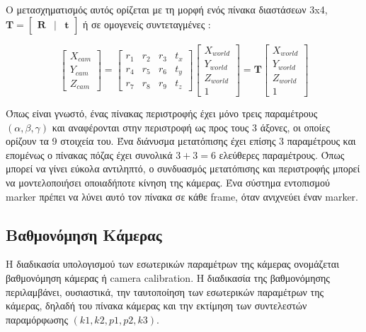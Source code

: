 Ο μετασχηματισμός αυτός ορίζεται με τη μορφή ενός πίνακα διαστάσεων 3x4, $\mathbf{T}=\begin{bmatrix}\mathbf{R} & | & \!\mathbf{t}\end{bmatrix}$ ή σε ομογενείς συντεταγμένες :

\begin{equation}
\begin{bmatrix}
X_{cam} \\ Y_{cam} \\ Z_{cam}
\end{bmatrix}
=
\begin{bmatrix}
r_{1} & r_{2} & r_{3} & t_{x}\\
r_{4} & r_{5} & r_{6} & t_{y}\\
r_{7} & r_{8} & r_{9} & t_{z}
\end{bmatrix}
\begin{bmatrix}
X_{world}\\
Y_{world}\\
Z_{world}\\
1
\end{bmatrix}
=\mathbf{T}\begin{bmatrix}
X_{world}\\
Y_{world}\\
Z_{world}\\
1
\end{bmatrix}
\end{equation}

Όπως είναι γνωστό, ένας πίνακας περιστροφής έχει μόνο τρεις παραμέτρους $(\alpha, \beta, \gamma)$ και αναφέρονται στην περιστροφή ως προς τους 3 άξονες, οι οποίες ορίζουν τα 9 στοιχεία του. Ένα διάνυσμα μετατόπισης έχει επίσης 3 παραμέτρους και επομένως ο πίνακας πόζας έχει συνολικά $3+3=6$ ελεύθερες παραμέτρους. Όπως μπορεί να γίνει εύκολα αντιληπτό, ο συνδυασμός μετατόπισης και περιστροφής μπορεί να μοντελοποιήσει οποιαδήποτε κίνηση της κάμερας. Ένα σύστημα εντοπισμού marker πρέπει να λύνει αυτό τον πίνακα σε κάθε frame, όταν ανιχνεύει έναν marker.






\subsection{Βαθμονόμηση Κάμερας}


Η διαδικασία υπολογισμού των εσωτερικών παραμέτρων της κάμερας ονομάζεται βαθμονόμηση κάμερας ή camera calibration. 
Η διαδικασία της βαθμονόμησης περιλαμβάνει, ουσιαστικά, την ταυτοποίηση των εσωτερικών παραμέτρων της κάμερας, δηλαδή του πίνακα κάμερας και την εκτίμηση των συντελεστών παραμόρφωσης $(k1, k2, p1, p2, k3)$.

